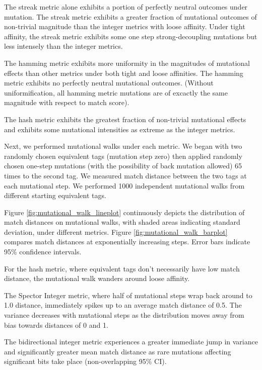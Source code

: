 The streak metric alone exhibits a portion of perfectly neutral outcomes under mutation.
The streak metric exhibits a greater fraction of mutational outcomes of non-trivial magnitude than the integer metrics with loose affinity.
Under tight affinity, the streak metric exhibits some one step strong-decoupling mutations but less intensely than the integer metrics.

The hamming metric exhibits more uniformity in the magnitudes of mutational effects than other metrics under both tight and loose affinities.
The hamming metric exhibits no perfectly neutral mutational outcomes.
(Without uniformification, all hamming metric mutations are of excactly the same magnitude with respect to match score).

The hash metric exhibits the greatest fraction of non-trivial mutational effects and exhibits some mutational intensities as extreme as the integer metrics.




Next, we performed mutational walks under each metric.
We began with two randomly chosen equivalent tags (mutation step zero) then applied randomly chosen one-step mutations (with the possibility of back mutation allowed) 65 times to the second tag.
We measured match distance between the two tags at each mutational step.
We performed 1000 independent mutational walks from different starting equivalent tags.

Figure \ref{fig:mutational_walk_lineplot} continuously depicts the distribution of match distances on mutational walks, with shaded areas indicating standard deviation, under different metrics.
Figure \ref{fig:mutational_walk_barplot} compares match distances at exponentially increasing steps.
Error bars indicate 95\% confidence intervals.

For the hash metric, where equivalent tags don't necessarily have low match distance, the mutational walk wanders around loose affinity.

The Spector Integer metric, where half of mutational steps wrap back around to 1.0 distance, immediately spikes up to an average match distance of 0.5.
The variance decreases with mutational steps as the distribution moves away from bias towards distances of 0 and 1.

The bidirectional integer metric experiences a greater immediate jump in variance and significantly greater mean match distance as rare mutations affecting significant bits take place (non-overlapping 95\% CI).

